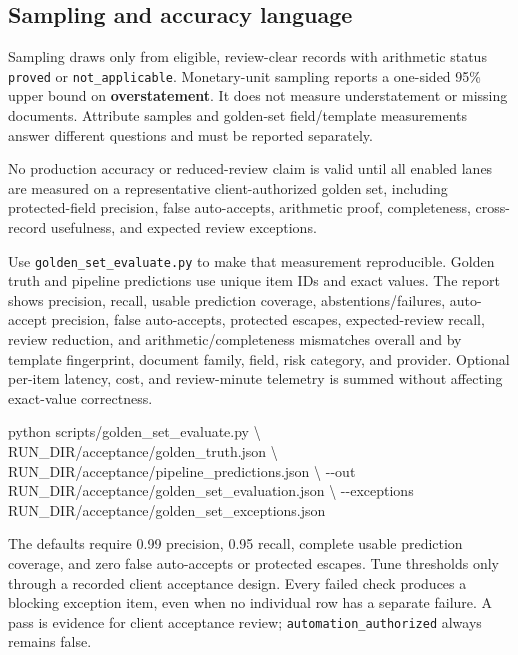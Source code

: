 \documentclass[
]{article}
\newenvironment{Shaded}{}{}
\newcommand{\AttributeTok}[1]{\textcolor[rgb]{0.49,0.56,0.16}{#1}}
\newcommand{\DataTypeTok}[1]{\textcolor[rgb]{0.56,0.13,0.00}{#1}}
\newcommand{\ExtensionTok}[1]{#1}
\newcommand{\NormalTok}[1]{#1}
\begin{document}
\subsection{Sampling and accuracy
language}\label{sampling-and-accuracy-language}

Sampling draws only from eligible, review-clear records with arithmetic
status \texttt{proved} or \texttt{not\_\allowbreak{}applicable}.
Monetary-unit sampling reports a one-sided 95\% upper bound on
\textbf{overstatement}. It does not measure understatement or missing
documents. Attribute samples and golden-set field/template measurements
answer different questions and must be reported separately.

No production accuracy or reduced-review claim is valid until all
enabled lanes are measured on a representative client-authorized golden
set, including protected-field precision, false auto-accepts, arithmetic
proof, completeness, cross-record usefulness, and expected review
exceptions.

Use \texttt{golden\_\allowbreak{}set\_\allowbreak{}evaluate.py} to make
that measurement reproducible. Golden truth and pipeline predictions use
unique item IDs and exact values. The report shows precision, recall,
usable prediction coverage, abstentions/failures, auto-accept precision,
false auto-accepts, protected escapes, expected-review recall, review
reduction, and arithmetic/completeness mismatches overall and by
template fingerprint, document family, field, risk category, and
provider. Optional per-item latency, cost, and review-minute telemetry
is summed without affecting exact-value correctness.

\begin{Shaded}
\begin{Highlighting}[]
\ExtensionTok{python}\NormalTok{ scripts/golden\_set\_evaluate.py }\DataTypeTok{\textbackslash{}}
\NormalTok{  RUN\_DIR/acceptance/golden\_truth.json }\DataTypeTok{\textbackslash{}}
\NormalTok{  RUN\_DIR/acceptance/pipeline\_predictions.json }\DataTypeTok{\textbackslash{}}
  \AttributeTok{{-}{-}out}\NormalTok{ RUN\_DIR/acceptance/golden\_set\_evaluation.json }\DataTypeTok{\textbackslash{}}
  \AttributeTok{{-}{-}exceptions}\NormalTok{ RUN\_DIR/acceptance/golden\_set\_exceptions.json}
\end{Highlighting}
\end{Shaded}

The defaults require 0.99 precision, 0.95 recall, complete usable
prediction coverage, and zero false auto-accepts or protected escapes.
Tune thresholds only through a recorded client acceptance design. Every
failed check produces a blocking exception item, even when no individual
row has a separate failure. A pass is evidence for client acceptance
review; \texttt{automation\_\allowbreak{}authorized} always remains
false.
\end{document}
